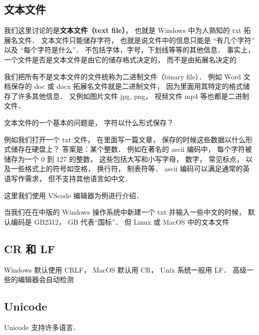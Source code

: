
\subsection{文本文件}
我们这里讨论的是\textbf{文本文件（text file）}， 也就是 Windows 中为人熟知的 txt 拓展名文件． 文本文件只能储存字符， 也就是说文件中的信息只能是 “有几个字符” 以及 “每个字符是什么”． 不包括字体，字号，下划线等等的其他信息． 事实上， 一个文件是否是文本文件是由它的储存格式决定的， 而不是由拓展名决定的

我们把所有不是文本文件的文件统称为二进制文件（binary file）． 例如 Word 文档保存的 doc 或 docx 拓展名文件就是二进制文件， 因为里面用其特定的格式储存了许多其他信息．  又例如图片文件 jpg, png， 视频文件 mp4 等也都是二进制文件．

文本文件的一个基本的问题是， 字符以什么形式保存？ 

例如我们打开一个 txt 文件， 在里面写一篇文章， 保存的时候这些数据以什么形式储存在硬盘上？ 答案是：某个整数． 例如在著名的 ascii 编码中， 每个字符被储存为一个 0 到 127 的整数， 这些包括大写和小写字母， 数字， 常见标点， 以及一些格式上的符号如空格， 换行符， 制表符等． ascii 编码可以满足通常的英语写作需求， 但不支持其他语言如中文．



这里我们使用 VScode 编辑器为例进行介绍． 

当我们在在中版的 Windows 操作系统中新建一个 txt 并输入一些中文的时候， 默认编码是 GB2312， GB 代表“国标”． 但 Linux 或 MacOS 中的文本文件

\subsection{CR 和 LF}
Windows 默认使用 CRLF， MacOS 默认用 CR， Unix 系统一般用 LF． 高级一些的编辑器会自动检测

\subsection{Unicode}
Unicode 支持许多语言．
